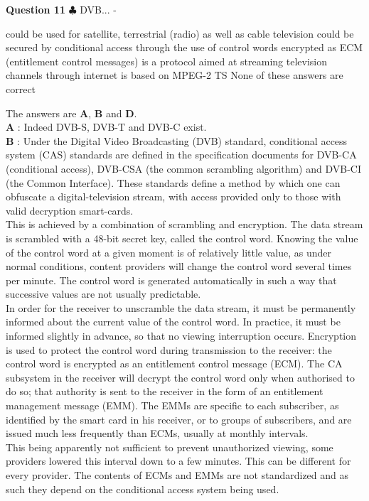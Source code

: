 \documentclass[en]{sourcefiles/eplexam}
\newcounter{choice}
\renewcommand\thechoice{\textbf{\Alph{choice}}}
\newcommand\choicelabel{\thechoice$\quad$}
\newenvironment{choices}%
  {\list{\choicelabel}%
     {\usecounter{choice}\def\makelabel##1{\hss\llap{##1}}%
       \settowidth{\leftmargin}{W.\hskip\labelsep\hskip 2.5em}%
       \def\choice{%
         \item
       } %
       \labelwidth\leftmargin\advance\labelwidth-\labelsep
       \topsep=0pt
       \partopsep=0pt
     }%
  }%
  {\endlist}
\begin{document}
\textbf{Question 11} $\clubsuit$ DVB...
\begin{choices}
     \choice could be used for satellite, terrestrial (radio) as well as cable television
     \choice could be secured by conditional access through the use of control words encrypted as ECM (entitlement control messages)
     \choice is a protocol aimed at streaming television channels through internet
     \choice is based on MPEG-2 TS
     \choice None of these answers are correct
\end{choices}
\begin{solution}
The answers are \textbf{A}, \textbf{B} and \textbf{D}.\\


\noindent \textbf{A} :  Indeed DVB-S, DVB-T and DVB-C exist.\\

\noindent \textbf{B} :  
Under the Digital Video Broadcasting (DVB) standard, conditional access system (CAS) standards are defined in the specification documents for DVB-CA (conditional access), DVB-CSA (the common scrambling algorithm) and DVB-CI (the Common Interface). These standards define a method by which one can obfuscate a digital-television stream, with access provided only to those with valid decryption smart-cards.\\

\noindent This is achieved by a combination of scrambling and encryption. The data stream is scrambled with a 48-bit secret key, called the control word. Knowing the value of the control word at a given moment is of relatively little value, as under normal conditions, content providers will change the control word several times per minute. The control word is generated automatically in such a way that successive values are not usually predictable.\\

\noindent In order for the receiver to unscramble the data stream, it must be permanently informed about the current value of the control word. In practice, it must be informed slightly in advance, so that no viewing interruption occurs. Encryption is used to protect the control word during transmission to the receiver: the control word is encrypted as an entitlement control message (ECM). The CA subsystem in the receiver will decrypt the control word only when authorised to do so; that authority is sent to the receiver in the form of an entitlement management message (EMM). The EMMs are specific to each subscriber, as identified by the smart card in his receiver, or to groups of subscribers, and are issued much less frequently than ECMs, usually at monthly intervals.\\
This being apparently not sufficient to prevent unauthorized viewing, some providers lowered this interval down to a few minutes. This can be different for every provider. The contents of ECMs and EMMs are not standardized and as such they depend on the conditional access system being used.\\


\end{solution}
\end{document}
